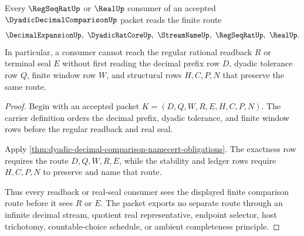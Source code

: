 \begin{theorem}
\label{thm:dyadic-decimal-comparison-readback-boundary}
Every $\RegSeqRatUp$ or $\RealUp$ consumer of an accepted $\DyadicDecimalComparisonUp$ packet reads the finite route
$$
\DecimalExpansionUp,\ \DyadicRatCoreUp,\ \StreamNameUp,\ \RegSeqRatUp,\ \RealUp .
$$
In particular, a consumer cannot reach the regular rational readback $R$ or terminal seal $E$ without first reading the decimal prefix row $D$, dyadic tolerance row $Q$, finite window row $W$, and structural rows $H,C,P,N$ that preserve the same route.
\end{theorem}
\begin{proof}
Begin with an accepted packet $K=(D,Q,W,R,E,H,C,P,N)$. The carrier definition orders the decimal prefix, dyadic tolerance, and finite window rows before the regular readback and real seal.

Apply \autoref{thm:dyadic-decimal-comparison-namecert-obligations}. The exactness row requires the route $D,Q,W,R,E$, while the stability and ledger rows require $H,C,P,N$ to preserve and name that route.

Thus every readback or real-seal consumer sees the displayed finite comparison route before it sees $R$ or $E$. The packet exports no separate route through an infinite decimal stream, quotient real representative, endpoint selector, host trichotomy, countable-choice schedule, or ambient completeness principle.
\end{proof}




